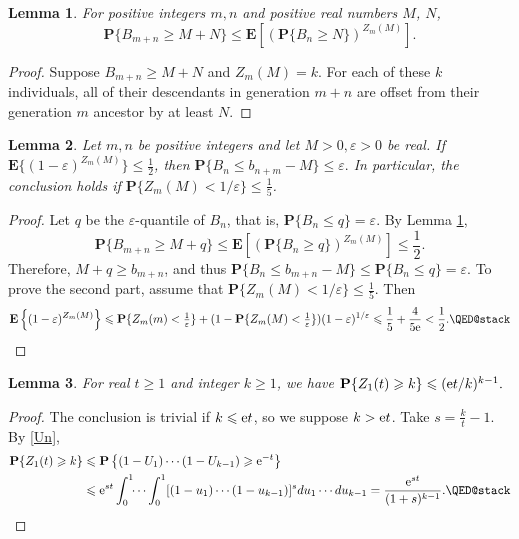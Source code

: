 \documentclass[12pt]{amsart}
\theoremstyle{remark}
\theoremstyle{plain}
\newtheorem{lem}{Lemma}[section]
\numberwithin{equation}{section}
\newcommand{\PPP}{\mathbf P}
\newcommand{\EEE}{\mathbf E}
\newcommand{\eps}{\ensuremath{\varepsilon}}
\renewcommand{\(}{\left(}
\renewcommand{\)}{\right)}
\newcommand{\er}{{\rm e}}  %
\renewcommand{\le}{\leqslant}
\renewcommand{\ge}{\geqslant}
\begin{document}
\begin{lem}\label{tight1}
For positive integers $m,n$ and positive real numbers $M$, $N$,
$$
\PPP \{ B_{m+n} \ge M+N \} \le \EEE [ (\PPP \{ B_n\ge N \} )^{Z_m(M)}].
$$
\end{lem}

\begin{proof}
Suppose $B_{m+n} \ge M+N$ and $Z_m(M) = k$.  For each of these $k$
individuals, all of their descendants in
generation $m+n$ are offset from their generation $m$ ancestor by at
least $N$.
\end{proof}


\begin{lem}\label{tight2}
Let $m,n$ be positive integers and let $M>0, \eps>0$ be real.
If $\EEE \{ (1-\eps)^{Z_m(M)} \} \le  \frac12$, then
$\PPP \{ B_n \le b_{n+m} - M \} \le \eps.$
In particular, the conclusion holds if $\PPP \{ Z_m(M) < 1/\eps \} \le \frac15$.
\end{lem}

\begin{proof}
Let $q$ be the $\eps$-quantile of $B_n$,
that is, $\PPP \{ B_n \le q \} = \eps$.  By Lemma \ref{tight1},
\[
\PPP \{ B_{m+n} \ge M+q \}
\le \EEE \left[ \( \PPP \{ B_n \ge q \} \)^{Z_m(M)} \right] \le \frac12.
\]
Therefore, $M+q \ge b_{m+n}$, and thus $\PPP \{ B_n \le b_{m+n} - M\} \le
\PPP \{ B_n \le q \} = \eps$.  To prove the second part,
assume that $\PPP \{ Z_m(M) < 1/\eps \} \le \frac15$.
Then
\[
\EEE \left\{ (1-\eps)^{Z_m(M)} \right\} \le \PPP 
\{ Z_m(m) < \tfrac{1}{\eps} \} + (1-\PPP\{Z_m(M)<\tfrac{1}{\eps}\})
(1-\eps)^{1/\eps}  \le \frac15 + \frac{4}{5\er} < \frac12.
\qedhere
\]
\end{proof}


\begin{lem}\label{Z1}
For real $t\ge 1$ and integer $k\ge 1$, we have
$\PPP \{ Z_1(t) \ge k \} \le (\er t/k)^{k-1}.$
\end{lem}

\begin{proof}
The conclusion is trivial if $k\le \er t$, so we suppose $k>\er t$.
Take  $s = \frac{k}{t} - 1$.  By \eqref{Un},
\begin{align*}
\PPP \{ Z_1(t)\ge k \} &\le \PPP \left\{ (1-U_1)\cdots (1-U_{k-1}) \ge 
\er^{-t} \right\} \\
&\le \er^{st} \int_0^1 \!\! \cdots \int_0^1 [(1-u_1) \cdots (1-u_{k-1})]^s
d u_1 \cdots d u_{k-1} 
= \frac{\er^{st}}{(1+s)^{k-1}}.
\qedhere
\end{align*}
\end{proof}
\end{document}
